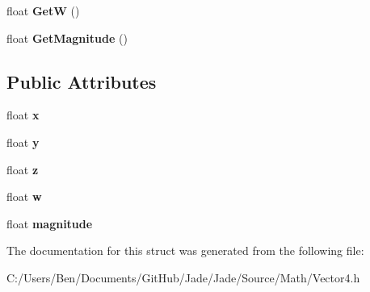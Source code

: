 \begin{DoxyCompactItemize}
\item 
\hypertarget{struct_jade_1_1_math_1_1_vector4_a9ad4cd3b5dffb8aeb428ba26287c589c}{}float {\bfseries Get\+W} ()\label{struct_jade_1_1_math_1_1_vector4_a9ad4cd3b5dffb8aeb428ba26287c589c}

\item 
\hypertarget{struct_jade_1_1_math_1_1_vector4_aef10cbee168bb99e46a7d4ba3543b620}{}float {\bfseries Get\+Magnitude} ()\label{struct_jade_1_1_math_1_1_vector4_aef10cbee168bb99e46a7d4ba3543b620}

\end{DoxyCompactItemize}
\subsection*{Public Attributes}
\begin{DoxyCompactItemize}
\item 
\hypertarget{struct_jade_1_1_math_1_1_vector4_a4fc8b8e4786461e1495daf2eb43f3d1c}{}float {\bfseries x}\label{struct_jade_1_1_math_1_1_vector4_a4fc8b8e4786461e1495daf2eb43f3d1c}

\item 
\hypertarget{struct_jade_1_1_math_1_1_vector4_a7f99929ae36c4b5e63ae077e0db2ee47}{}float {\bfseries y}\label{struct_jade_1_1_math_1_1_vector4_a7f99929ae36c4b5e63ae077e0db2ee47}

\item 
\hypertarget{struct_jade_1_1_math_1_1_vector4_a9d89c361326b8794c3a2db4d63b12909}{}float {\bfseries z}\label{struct_jade_1_1_math_1_1_vector4_a9d89c361326b8794c3a2db4d63b12909}

\item 
\hypertarget{struct_jade_1_1_math_1_1_vector4_a58a32332a8a4bba8bcd1f11adb9edba4}{}float {\bfseries w}\label{struct_jade_1_1_math_1_1_vector4_a58a32332a8a4bba8bcd1f11adb9edba4}

\item 
\hypertarget{struct_jade_1_1_math_1_1_vector4_a744e34f4956a96da558964ef1ce2cbc1}{}float {\bfseries magnitude}\label{struct_jade_1_1_math_1_1_vector4_a744e34f4956a96da558964ef1ce2cbc1}

\end{DoxyCompactItemize}


The documentation for this struct was generated from the following file\+:\begin{DoxyCompactItemize}
\item 
C\+:/\+Users/\+Ben/\+Documents/\+Git\+Hub/\+Jade/\+Jade/\+Source/\+Math/Vector4.\+h\end{DoxyCompactItemize}
